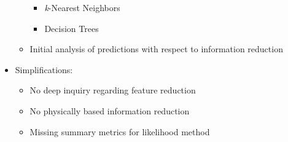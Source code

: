 \begin{frame}
\begin{minipage}{0.65\textwidth}
\begin{itemize}
\begin{itemize}
\begin{itemize}
          \item \textit{k}-Nearest Neighbors
          \item Decision Trees
        \end{itemize}
      \item Initial analysis of predictions with respect to information reduction
    \end{itemize}
    \item Simplifications:
    \begin{itemize}
      \item No deep inquiry regarding feature reduction
      \item No physically based information reduction
      \item Missing summary metrics for likelihood method
    \end{itemize}
  \end{itemize}
  \end{minipage}
\end{frame}



